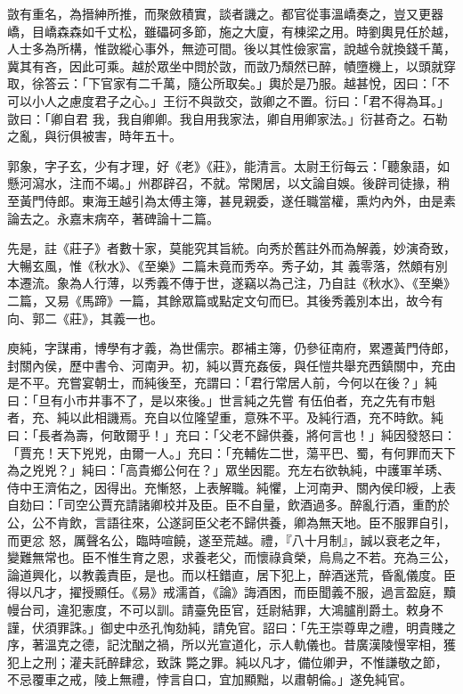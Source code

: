 \begin{pinyinscope}
 敳有重名，為搢紳所推，而聚斂積實，談者譏之。都官從事溫嶠奏之，豈又更器嶠，目嶠森森如千丈松，雖礧砢多節，施之大廈，有棟梁之用。時劉輿見任於越，人士多為所構，惟敳縱心事外，無迹可間。後以其性儉家富，說越令就換錢千萬，冀其有吝，因此可乘。越於眾坐中問於敳，而敳乃頹然已醉，幘墮機上，以頭就穿取，徐答云：「下官家有二千萬，隨公所取矣。」輿於是乃服。越甚悅，因曰：「不可以小人之慮度君子之心。」王衍不與敳交，敳卿之不置。衍曰：「君不得為耳。」敳曰：「卿自君
 我，我自卿卿。我自用我家法，卿自用卿家法。」衍甚奇之。石勒之亂，與衍俱被害，時年五十。



 郭象，字子玄，少有才理，好《老》《莊》，能清言。太尉王衍每云：「聽象語，如懸河瀉水，注而不竭。」州郡辟召，不就。常閑居，以文論自娛。後辟司徒掾，稍至黃門侍郎。東海王越引為太傅主簿，甚見親委，遂任職當權，熏灼內外，由是素論去之。永嘉末病卒，著碑論十二篇。



 先是，註《莊子》者數十家，莫能究其旨統。向秀於舊註外而為解義，妙演奇致，大暢玄風，惟《秋水》、《至樂》二篇未竟而秀卒。秀子幼，其
 義零落，然頗有別本遷流。象為人行薄，以秀義不傳于世，遂竊以為己注，乃自註《秋水》、《至樂》二篇，又易《馬蹄》一篇，其餘眾篇或點定文句而巳。其後秀義別本出，故今有向、郭二《莊》，其義一也。



 庾純，字謀甫，博學有才義，為世儒宗。郡補主簿，仍參征南府，累遷黃門侍郎，封關內侯，歷中書令、河南尹。初，純以賈充姦佞，與任愷共舉充西鎮關中，充由是不平。充嘗宴朝士，而純後至，充謂曰：「君行常居人前，今何以在後？」純曰：「旦有小市井事不了，是以來後。」世言純之先嘗
 有伍伯者，充之先有市魁者，充、純以此相譏焉。充自以位隆望重，意殊不平。及純行酒，充不時飲。純曰：「長者為壽，何敢爾乎！」充曰：「父老不歸供養，將何言也！」純因發怒曰：「賈充！天下兇兇，由爾一人。」充曰：「充輔佐二世，蕩平巴、蜀，有何罪而天下為之兇兇？」純曰：「高貴鄉公何在？」眾坐因罷。充左右欲執純，中護軍羊琇、侍中王濟佑之，因得出。充慚怒，上表解職。純懼，上河南尹、關內侯印綬，上表自劾曰：「司空公賈充請諸卿校并及臣。臣不自量，飲酒過多。醉亂行酒，重酌於公，公不肯飲，言語往來，公遂訶臣父老不歸供養，卿為無天地。臣不服罪自引，而更忿
 怒，厲聲名公，臨時喧饒，遂至荒越。禮，『八十月制』，誠以衰老之年，變難無常也。臣不惟生育之恩，求養老父，而懷祿貪榮，烏鳥之不若。充為三公，論道興化，以教義責臣，是也。而以枉錯直，居下犯上，醉酒迷荒，昏亂儀度。臣得以凡才，擢授顯任。《易》戒濡首，《論》誨酒困，而臣聞義不服，過言盈庭，黷幔台司，違犯憲度，不可以訓。請臺免臣官，廷尉結罪，大鴻臚削爵土。敕身不謹，伏須罪誅。」御史中丞孔恂劾純，請免官。詔曰：「先王崇尊卑之禮，明貴賤之序，著溫克之德，記沈酗之禍，所以光宣道化，示人軌儀也。昔廣漢陵慢宰相，獲犯上之刑；灌夫託醉肆忿，致誅
 斃之罪。純以凡才，備位卿尹，不惟謙敬之節，不忌覆車之戒，陵上無禮，悖言自口，宜加顯黜，以肅朝倫。」遂免純官。




\end{pinyinscope}
